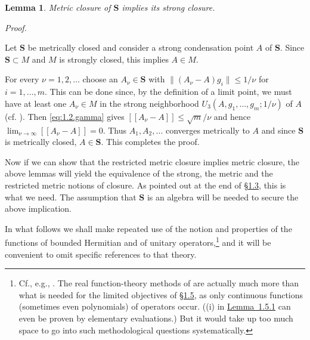 \documentclass[b5paper,twoside]{article}
\newcommand{\secref}[2]{\hyperref[#1]{\mbox{\S#2}}}
\newcommand{\lemref}[2]{\hyperref[#1]{\mbox{Lemma~#2}}}
\theoremstyle{mvnplain}
\newtheorem{lemma}{Lemma}[section]
\renewenvironment{proof}[1][Proof]{%
  \par\addvspace{0.35\baselineskip}%
  \noindent\textit{#1.}\ \normalfont\ignorespaces
}{%
  \par\addvspace{0.35\baselineskip}%
}
\newcommand{\M}{\mathbf M}
\newcommand{\Metric}[1]{\left[\!\left[#1\right]\!\right]}
\def\M{M}%
\def\Metric#1{[[#1]]}%
\begin{document}
\begin{lemma}\label{lem:1.4.2}
Metric closure of $\mathbf S$ implies its strong closure.
\end{lemma}
\begin{proof}
Let $\mathbf S$ be metrically closed and consider a strong condensation point
$A$ of $\mathbf S$.  Since $\mathbf S\subset\M$ and $\M$ is strongly closed,
this implies $A\in\M$.

For every $\nu=1,2,\ldots$ choose an $A_\nu\in\mathbf S$ with
$\lVert(A_\nu-A)g_i\rVert\leq1/\nu$ for $i=1,\ldots,m$.  This can be done
since, by the definition of a limit point, we must have at least one
$A_\nu\in\M$ in the strong neighborhood
$U_3(A,g_1,\ldots,g_m;1/\nu)$ of $A$ (cf. \cite[\S2, p.~381]{ref2}).  Then
\eqref{eq:1.2.gamma} gives
$\Metric{A_\nu-A}\leq\sqrt{m}/\nu$ and hence
$\lim_{\nu\to\infty}\Metric{A_\nu-A}=0$.  Thus $A_1,A_2,\ldots$ converges
metrically to $A$ and since $\mathbf S$ is metrically closed, $A\in\mathbf S$.
This completes the proof.
\end{proof}

Now if we can show that the restricted metric closure implies metric closure,
the above lemmas will yield the equivalence of the strong, the metric and the
restricted metric notions of closure.  As pointed out at the end of
\secref{sec:1.3}{1.3}, this is what we need.  The assumption that $\mathbf S$ is
an algebra will be needed to secure the above implication.

In what follows we shall make repeated use of the notion and properties of the
functions of bounded Hermitian and of unitary operators,\footnote{Cf., e.g.,
\cite[pp.~205 and 220]{ref3}.  The real function-theory methods of \cite{ref3}
are actually much more than what is needed for the limited objectives of
\secref{sec:1.5}{1.5}, as only continuous functions (sometimes even polynomials)
of operators occur.  ((i) in \lemref{lem:1.5.1}{1.5.1} can even be proven by
elementary evaluations.)  But it would take up too much space to go into such
methodological questions systematically.} and it will be convenient to omit
specific references to that theory.
\end{document}
